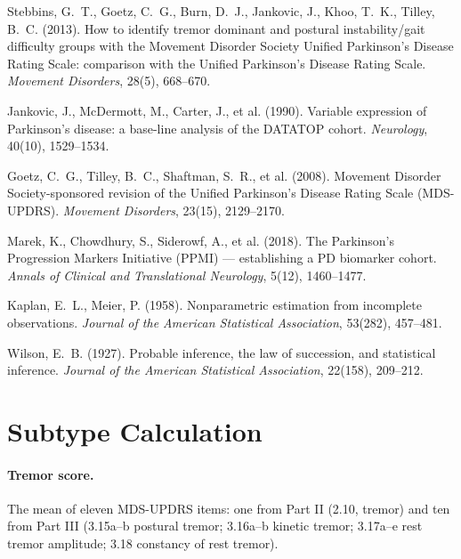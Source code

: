 \documentclass[11pt,a4paper]{article}
\begin{document}
\begin{enumerate}[label={[\arabic*]},leftmargin=2.4em]
  \item Stebbins, G.~T., Goetz, C.~G., Burn, D.~J., Jankovic, J., Khoo, T.~K.,
        Tilley, B.~C. (2013). How to identify tremor dominant and postural
        instability/gait difficulty groups with the Movement Disorder Society
        Unified Parkinson's Disease Rating Scale: comparison with the Unified
        Parkinson's Disease Rating Scale. \emph{Movement Disorders}, 28(5),
        668--670.

  \item Jankovic, J., McDermott, M., Carter, J., et al. (1990). Variable
        expression of Parkinson's disease: a base-line analysis of the DATATOP
        cohort. \emph{Neurology}, 40(10), 1529--1534.

  \item Goetz, C.~G., Tilley, B.~C., Shaftman, S.~R., et al. (2008). Movement
        Disorder Society-sponsored revision of the Unified Parkinson's Disease
        Rating Scale (MDS-UPDRS). \emph{Movement Disorders}, 23(15), 2129--2170.

  \item Marek, K., Chowdhury, S., Siderowf, A., et al. (2018). The Parkinson's
        Progression Markers Initiative (PPMI) --- establishing a PD biomarker
        cohort. \emph{Annals of Clinical and Translational Neurology}, 5(12),
        1460--1477.

  \item Kaplan, E.~L., Meier, P. (1958). Nonparametric estimation from
        incomplete observations. \emph{Journal of the American Statistical
        Association}, 53(282), 457--481.

  \item Wilson, E.~B. (1927). Probable inference, the law of succession, and
        statistical inference. \emph{Journal of the American Statistical
        Association}, 22(158), 209--212.
\end{enumerate}

\appendix
\section{Subtype Calculation}

\paragraph{Tremor score.} The mean of eleven MDS-UPDRS items: one from Part II
(2.10, tremor) and ten from Part III (3.15a--b postural tremor; 3.16a--b kinetic
tremor; 3.17a--e rest tremor amplitude; 3.18 constancy of rest tremor).
\end{document}
